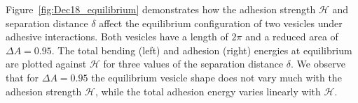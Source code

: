\documentclass[prf,superscriptaddress,showkeys]{revtex4-1}
\begin{document}
Figure~\ref{fig:Dec18_equilibrium} demonstrates how the adhesion
strength $\mathcal{H}$ and separation distance $\delta$ affect the
equilibrium configuration of two vesicles under adhesive interactions.
Both vesicles have a length of $2\pi$ and a reduced area of $\Delta A =
0.95$.  The total bending (left) and adhesion (right) energies at
equilibrium are plotted against $\mathcal{H}$ for three values of the
separation distance $\delta$.  We observe that for $\Delta A=0.95$ the
equilibrium vesicle shape does not vary much with the adhesion strength
$\mathcal{H}$, while the total adhesion energy varies linearly with
$\mathcal{H}$.

%
%
%
%
%
\end{document}
